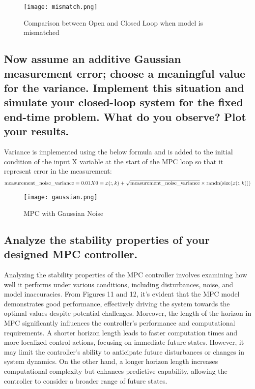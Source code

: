 \documentclass[a4paper, 12pt]{report}
\begin{document}
\begin{figure}[H]
    \centering
    \texttt{[image: mismatch.png]}
    \caption{Comparison between Open and Closed Loop when model is mismatched}
    \label{fig:enter-label}
\end{figure}

\subsection{Now assume an additive Gaussian measurement error; choose a meaningful value for the variance.
Implement this situation and simulate your closed-loop system for the fixed end-time problem. What do you observe? Plot your results.}
Variance is implemented using the below formula and is added to the initial condition of the input X variable at the start of the MPC loop so that it represent error in the measurement:
\[
\text{measurement\_noise\_variance} = 0.01 \\
\\
X0 = x(:,k) + \sqrt{\text{measurement\_noise\_variance}} \times \text{randn}(\text{size}(x(:, k))) 
\]

\begin{figure}[h]
    \centering
    \texttt{[image: gaussian.png]}
    \caption{MPC with Gaussian Noise}
    \label{fig:enter-label}
\end{figure}

\subsection{Analyze the stability properties of your designed MPC controller.}
Analyzing the stability properties of the MPC controller involves examining how well it performs under various conditions, including disturbances, noise, and model inaccuracies. From Figures 11 and 12, it's evident that the MPC model demonstrates good performance, effectively driving the system towards the optimal values despite potential challenges.
Moreover, the length of the horizon in MPC significantly influences the controller's performance and computational requirements. A shorter horizon length leads to faster computation times and more localized control actions, focusing on immediate future states. However, it may limit the controller's ability to anticipate future disturbances or changes in system dynamics. On the other hand, a longer horizon length increases computational complexity but enhances predictive capability, allowing the controller to consider a broader range of future states.
\end{document}
